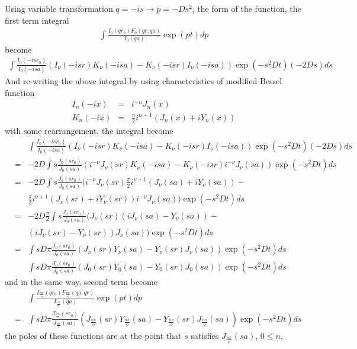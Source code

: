 \documentclass{article}
\begin{document}
Using variable transformation $q = -is \to p = -Ds^2$, the form of the function,
the first term integral
\begin{eqnarray}
      \int\frac{I_0(qr_0)F_0(qr, qa)}{I_0(qa)}\exp(pt)dp
\end{eqnarray}
 become
\begin{eqnarray}
      \int\frac{I_0(-isr_0)}{I_0(-isa)}
      (I_\nu(-isr)K_\nu(-isa) - K_\nu(-isr)I_\nu(-isa))\exp(-s^2Dt)(-2Ds)ds
\end{eqnarray}
And re-writing the above integral by using characteristics of modified Bessel function
\begin{eqnarray}
    I_n(-ix) &=& i^{-n}J_n(x)\nonumber \\
    K_n(-ix) &=& \frac{\pi}{2}i^{n+1}(J_n(x)+iY_n(x))\nonumber
\end{eqnarray}
with some rearrangement, the integral become
\begin{eqnarray}
    & & \int\frac{I_0(-isr_0)}{I_0(-isa)}
        (I_\nu(-isr)K_\nu(-isa) - K_\nu(-isr)I_\nu(-isa))\exp(-s^2Dt)(-2Ds)ds
        \nonumber \\
    &=& -2D\int s\frac{J_0(sr_0)}{J_0(sa)}
        (i^{-\nu}J_\nu(sr)K_\nu(-isa) - K_\nu(-isr)i^{-\nu}J_\nu(sa))\exp(-s^2Dt)ds
        \nonumber \\
    &=& -2D\int s\frac{J_0(sr_0)}{J_0(sa)}
        (i^{-\nu}J_\nu(sr)\frac{\pi}{2}i^{\nu+1}(J_\nu(sa)+iY_\nu(sa)) - \nonumber \\
    & & \frac{\pi}{2}i^{\nu+1}(J_\nu(sr)+iY_\nu(sr))i^{-\nu}J_\nu(sa))\exp(-s^2Dt)ds
        \nonumber \\
    &=& -2D\frac{\pi}{2}\int s\frac{J_0(sr_0)}{J_0(sa)}
        (J_\nu(sr)(iJ_\nu(sa)-Y_\nu(sa)) - \nonumber \\
    & & (iJ_\nu(sr)-Y_\nu(sr))J_\nu(sa))\exp(-s^2Dt)ds
        \nonumber \\
    &=& \int sD\pi\frac{J_0(sr_0)}{J_0(sa)}
        (J_\nu(sr)Y_\nu(sa) - Y_\nu(sr)J_\nu(sa))\exp(-s^2Dt)ds
        \nonumber \\
    & & \int sD\pi\frac{J_0(sr_0)}{J_0(sa)}
        (J_0(sr)Y_0(sa) - Y_0(sr)J_0(sa))\exp(-s^2Dt)ds
        \nonumber
\end{eqnarray}
and in the same way, second term become
\begin{eqnarray}
    & & \int\frac{I_{\frac{n\pi}{\phi}}(qr_0)F_{\frac{n\pi}{\phi}}(qa, qr)}
        {I_{\frac{n\pi}{\phi}}(qa)}\exp(pt)dp \nonumber \\
    &=& \int sD\pi\frac{J_{\frac{n\pi}{\phi}}(sr_0)}{J_{\frac{n\pi}{\phi}}(sa)}
        (J_{\frac{n\pi}{\phi}}(sr)Y_{\frac{n\pi}{\phi}}(sa) -
         Y_{\frac{n\pi}{\phi}}(sr)J_{\frac{n\pi}{\phi}}(sa))\exp(-s^2Dt)ds
        \nonumber
\end{eqnarray}
the poles of these functions are at the point that $s$ satisfies
$J_{\frac{n\pi}{\phi}}(sa)$, $0 \leq n$.
\end{document}
